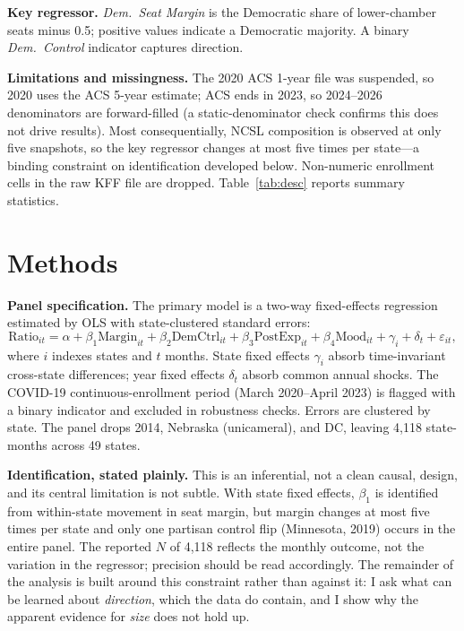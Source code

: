 \documentclass[9pt,twoside]{pnas-new}
\begin{document}
\textbf{Key regressor.} \emph{Dem.\ Seat Margin} is the Democratic share of lower-chamber seats minus 0.5; positive values indicate a Democratic majority. A binary \emph{Dem.\ Control} indicator captures direction.

\textbf{Limitations and missingness.} The 2020 ACS 1-year file was suspended, so 2020 uses the ACS 5-year estimate; ACS ends in 2023, so 2024--2026 denominators are forward-filled (a static-denominator check confirms this does not drive results). Most consequentially, NCSL composition is observed at only five snapshots, so the key regressor changes at most five times per state---a binding constraint on identification developed below. Non-numeric enrollment cells in the raw KFF file are dropped. Table~\ref{tab:desc} reports summary statistics.

\section*{Methods}

\textbf{Panel specification.} The primary model is a two-way fixed-effects regression estimated by OLS with state-clustered standard errors:
\[
\mathrm{Ratio}_{it}=\alpha+\beta_1\mathrm{Margin}_{it}+\beta_2\mathrm{DemCtrl}_{it}+\beta_3\mathrm{PostExp}_{it}+\beta_4\mathrm{Mood}_{it}+\gamma_i+\delta_t+\varepsilon_{it},
\]
where $i$ indexes states and $t$ months. State fixed effects $\gamma_i$ absorb time-invariant cross-state differences; year fixed effects $\delta_t$ absorb common annual shocks. The COVID-19 continuous-enrollment period (March 2020--April 2023) is flagged with a binary indicator and excluded in robustness checks. Errors are clustered by state. The panel drops 2014, Nebraska (unicameral), and DC, leaving 4{,}118 state-months across 49 states.

\textbf{Identification, stated plainly.} This is an inferential, not a clean causal, design, and its central limitation is not subtle. With state fixed effects, $\beta_1$ is identified from within-state movement in seat margin, but margin changes at most five times per state and only one partisan control flip (Minnesota, 2019) occurs in the entire panel. The reported $N$ of 4{,}118 reflects the monthly outcome, not the variation in the regressor; precision should be read accordingly. The remainder of the analysis is built around this constraint rather than against it: I ask what can be learned about \emph{direction}, which the data do contain, and I show why the apparent evidence for \emph{size} does not hold up.
\end{document}
